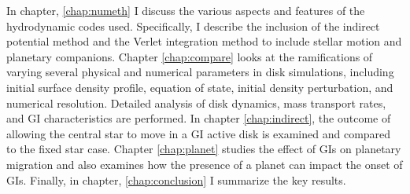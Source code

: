 In chapter, \ref{chap:numeth} I discuss the various aspects and features of the hydrodynamic codes used. Specifically, I describe the inclusion of the indirect potential method and the Verlet integration method to include stellar motion and planetary companions. Chapter \ref{chap:compare} looks at the ramifications of varying several physical and numerical parameters in disk simulations, including initial surface density profile, equation of state, initial density perturbation, and numerical resolution. Detailed analysis of disk dynamics, mass transport rates, and GI characteristics are performed. In chapter \ref{chap:indirect}, the outcome of allowing the central star to move in a GI active disk is examined and compared to the fixed star case. Chapter \ref{chap:planet} studies the effect of GIs on planetary migration and also examines how the presence of a planet can impact the onset of GIs. Finally, in chapter, \ref{chap:conclusion} I summarize the key results. 

